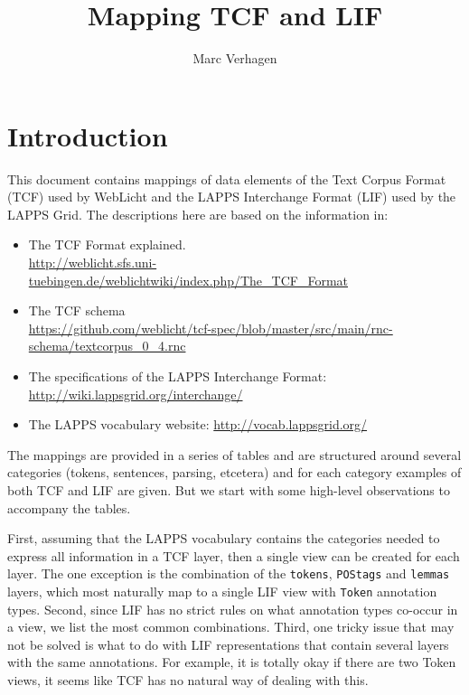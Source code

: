 \documentclass[11pt]{article}
\title{Mapping TCF and LIF}
\author{Marc Verhagen}
\newcommand{\tag}[1]{{\tt #1}}
\begin{document}
\maketitle


\section{Introduction}

This document contains mappings of data elements of the Text Corpus Format (TCF) used by WebLicht and the LAPPS Interchange Format (LIF) used by the LAPPS Grid. The descriptions here are based on the information in:

\begin{itemize}

\item The TCF Format explained.\\
{\color{blue}\href{http://weblicht.sfs.uni-tuebingen.de/weblichtwiki/index.php/The_TCF_Format}{http://weblicht.sfs.uni-tuebingen.de/weblichtwiki/index.php/The\_TCF\_Format}}

\item The TCF schema\\
{\color{blue}\href{https://github.com/weblicht/tcf-spec/blob/master/src/main/rnc-schema/textcorpus_0_4.rnc}{https://github.com/weblicht/tcf-spec/blob/master/src/main/rnc-schema/textcorpus\_0\_4.rnc}}

\item The specifications of the LAPPS Interchange Format:
{\color{blue}\href{http://wiki.lappsgrid.org/interchange/}{http://wiki.lappsgrid.org/interchange/}}

\item The LAPPS vocabulary website:
{\color{blue}\href{http://vocab.lappsgrid.org/}{http://vocab.lappsgrid.org/}}

\end{itemize}

The mappings are provided in a series of tables and are structured around several categories (tokens, sentences, parsing, etcetera) and for each category examples of both TCF and LIF are given. But we start with some high-level observations to accompany the tables. 

First, assuming that the LAPPS vocabulary contains the categories needed to express all information in a TCF layer, then a single view can be created for each layer. The one exception is the combination of the \tag{tokens}, \tag{POStags} and \tag{lemmas} layers, which most naturally map to a single LIF view with \tag{Token} annotation types. Second, since LIF has no strict rules on what annotation types co-occur in a view, we list the most common combinations. Third, one tricky issue that may not be solved is what to do with LIF representations that contain several layers with the same annotations. For example, it is totally okay if there are two Token views, it seems like TCF has no natural way of dealing with this.
\end{document}
